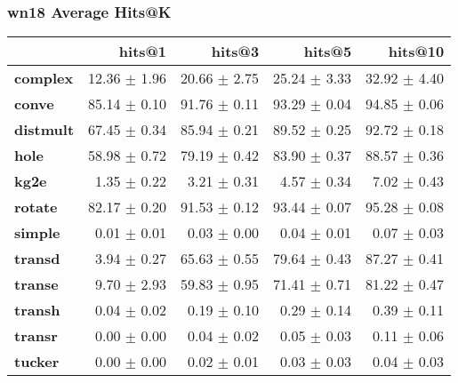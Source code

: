 \documentclass{article}
\begin{document}
\subsubsection{wn18 Average Hits@K}
    \begin{center}
    \begin{tabular}{lrrrr}
\toprule
{} &        hits@1 &        hits@3 &        hits@5 &       hits@10 \\
\midrule
\textbf{complex } &  12.36 $\pm$ 1.96 &  20.66 $\pm$ 2.75 &  25.24 $\pm$ 3.33 &  32.92 $\pm$ 4.40 \\
\textbf{conve   } &  85.14 $\pm$ 0.10 &  91.76 $\pm$ 0.11 &  93.29 $\pm$ 0.04 &  94.85 $\pm$ 0.06 \\
\textbf{distmult} &  67.45 $\pm$ 0.34 &  85.94 $\pm$ 0.21 &  89.52 $\pm$ 0.25 &  92.72 $\pm$ 0.18 \\
\textbf{hole    } &  58.98 $\pm$ 0.72 &  79.19 $\pm$ 0.42 &  83.90 $\pm$ 0.37 &  88.57 $\pm$ 0.36 \\
\textbf{kg2e    } &   1.35 $\pm$ 0.22 &   3.21 $\pm$ 0.31 &   4.57 $\pm$ 0.34 &   7.02 $\pm$ 0.43 \\
\textbf{rotate  } &  82.17 $\pm$ 0.20 &  91.53 $\pm$ 0.12 &  93.44 $\pm$ 0.07 &  95.28 $\pm$ 0.08 \\
\textbf{simple  } &   0.01 $\pm$ 0.01 &   0.03 $\pm$ 0.00 &   0.04 $\pm$ 0.01 &   0.07 $\pm$ 0.03 \\
\textbf{transd  } &   3.94 $\pm$ 0.27 &  65.63 $\pm$ 0.55 &  79.64 $\pm$ 0.43 &  87.27 $\pm$ 0.41 \\
\textbf{transe  } &   9.70 $\pm$ 2.93 &  59.83 $\pm$ 0.95 &  71.41 $\pm$ 0.71 &  81.22 $\pm$ 0.47 \\
\textbf{transh  } &   0.04 $\pm$ 0.02 &   0.19 $\pm$ 0.10 &   0.29 $\pm$ 0.14 &   0.39 $\pm$ 0.11 \\
\textbf{transr  } &   0.00 $\pm$ 0.00 &   0.04 $\pm$ 0.02 &   0.05 $\pm$ 0.03 &   0.11 $\pm$ 0.06 \\
\textbf{tucker  } &   0.00 $\pm$ 0.00 &   0.02 $\pm$ 0.01 &   0.03 $\pm$ 0.03 &   0.04 $\pm$ 0.03 \\
\bottomrule
\end{tabular}

    \end{center}
\end{document}
